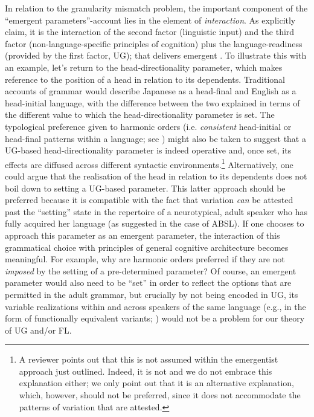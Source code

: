 \documentclass[output=paper]{langsci/langscibook}
\begin{document}
\largerpage
In relation to the granularity mismatch problem, the important component of the
\enquote{emergent parameters}-account lies in the element of
\emph{interaction}. As \citet{BibRobShee2014} explicitly claim, it is the
interaction of the second factor (linguistic input) and the third factor
(non-language-specific principles of cognition) plus the language-readiness
(provided by the first factor, \gls{UG}); that delivers emergent . To
illustrate this with an example, let’s return to the head-directionality
parameter, which makes reference to the position of a head in relation to its
dependents. Traditional accounts of grammar would describe Japanese as a
head-final and English as a head-initial language, with the difference between
the two explained in terms of the different value to which the
head-directionality parameter is set. The typological preference given to
harmonic orders (i.e. \emph{consistent} head-initial or head-final patterns
within a language; see \citealt{Hawkins2010}) might also be taken to suggest
that a UG-based head-directionality parameter is indeed operative and, once
set, its effects are diffused across different syntactic
environments.\footnote{A reviewer points out that this is not assumed within
    the emergentist approach just outlined. Indeed, it is not and we do not
    embrace this explanation either; we only point out that it is an
    alternative explanation, which, however, should not be preferred, since it
    does not accommodate the patterns of variation that are attested.}
    Alternatively, one could argue that the realisation of the head in relation
    to its dependents does not boil down to setting a \gls{UG}-based parameter.
    This latter approach should be preferred because it is compatible with the
    fact that variation \emph{can} be attested past the \enquote{setting} state in the
    repertoire of a neurotypical, adult speaker who has fully acquired her
    language (as suggested in the case of ABSL).  If one chooses to approach
    this parameter as an emergent parameter, the interaction of this
    grammatical choice with principles of general cognitive architecture
    becomes meaningful. For example, why are harmonic orders preferred if they
    are not \emph{imposed} by the setting of a pre-determined parameter? Of
    course, an emergent parameter would also need to be \enquote{set} in order
    to reflect the options that are permitted in the adult grammar, but
    crucially by not being encoded in \gls{UG}, its variable realizations
    within and across speakers of the same language (e.g., in the form of
    functionally equivalent variants; \citealt{LeivadaEtAl2017b}) would not be
    a problem for our theory of \gls{UG} and/or \gls{FL}.
\end{document}
